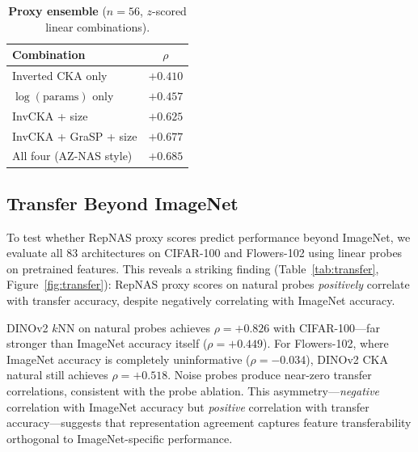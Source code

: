 \documentclass[10pt,twocolumn,letterpaper]{article}
\begin{document}
\begin{table}[t]
\centering
\caption{\textbf{Proxy ensemble} ($n{=}56$, $z$-scored linear combinations).}
\label{tab:ensemble}
\footnotesize
\setlength{\tabcolsep}{4pt}
\begin{tabular}{@{}lc@{}}
\toprule
\textbf{Combination} & \textbf{$\rho$} \\
\midrule
Inverted CKA only & $+0.410$ \\
$\log(\text{params})$ only & $+0.457$ \\
InvCKA + size & $+0.625$ \\
InvCKA + GraSP + size & $+0.677$ \\
All four (AZ-NAS style) & $+0.685$ \\
\bottomrule
\end{tabular}
\end{table}


\subsection{Transfer Beyond ImageNet}
\label{sec:transfer}

To test whether RepNAS proxy scores predict performance beyond ImageNet, we evaluate all 83 architectures on CIFAR-100 and Flowers-102 using linear probes on pretrained features.
This reveals a striking finding (Table~\ref{tab:transfer}, Figure~\ref{fig:transfer}): RepNAS proxy scores on natural probes \emph{positively} correlate with transfer accuracy, despite negatively correlating with ImageNet accuracy.

DINOv2 $k$NN on natural probes achieves $\rho = +0.826$ with CIFAR-100---far stronger than ImageNet accuracy itself ($\rho = +0.449$).
For Flowers-102, where ImageNet accuracy is completely uninformative ($\rho = -0.034$), DINOv2 CKA natural still achieves $\rho = +0.518$.
Noise probes produce near-zero transfer correlations, consistent with the probe ablation.
This asymmetry---\emph{negative} correlation with ImageNet accuracy but \emph{positive} correlation with transfer accuracy---suggests that representation agreement captures feature transferability orthogonal to ImageNet-specific performance.
\end{document}
